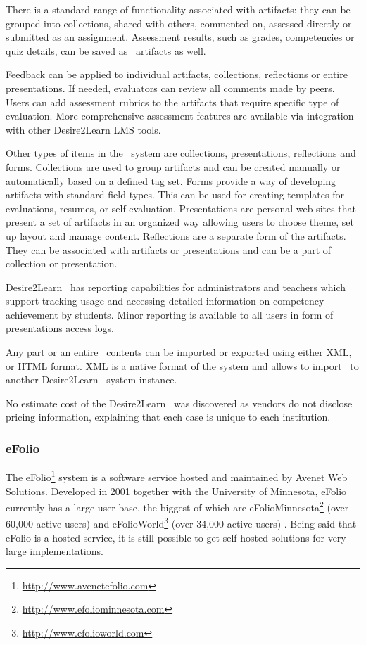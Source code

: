 There is a standard range of functionality associated with artifacts: they can
be grouped into collections, shared with others, commented on, assessed directly
or submitted as an assignment. Assessment results, such as grades, competencies
or quiz details, can be saved as \ep~artifacts as well.

Feedback can be applied to individual artifacts, collections, reflections or
entire presentations. If needed, evaluators can review all comments made by
peers. Users can add assessment rubrics to the artifacts that require specific
type of evaluation. More comprehensive assessment features are available via
integration with other Desire2Learn LMS tools.

Other types of items in the \ep~system are collections, presentations,
reflections and forms. Collections are used to group artifacts and can be
created manually or automatically based on a defined tag set. Forms provide a
way of developing artifacts with standard field types. This can be used for
creating templates for evaluations, resumes, or self-evaluation. Presentations
are personal web sites that present a set of artifacts in an organized way
allowing users to choose theme, set up layout and manage content. Reflections
are a separate form of the artifacts. They can be associated with artifacts or
presentations and can be a part of collection or presentation.

Desire2Learn \ep~has reporting capabilities for administrators and teachers which
support tracking usage and accessing detailed information on competency
achievement by students. Minor reporting is available to all users in form of
presentations access logs.

Any part or an entire \ep~contents can be imported or exported using
either XML, or HTML format. XML is a native format of the system and allows to
import \ep~to another Desire2Learn \ep~system instance.

No estimate cost of the Desire2Learn \ep~was discovered as vendors do not
disclose pricing information, explaining that each case is unique to each
institution.
 
\subsubsection{eFolio}

The eFolio\footnote{\url{http://www.avenetefolio.com}} system is a software
service hosted and maintained by Avenet Web Solutions. Developed in 2001
together with the University of Minnesota, eFolio currently has a large user
base, the biggest of which are
eFolioMinnesota\footnote{\url{http://www.efoliominnesota.com}} (over 60,000
active users) and eFolioWorld\footnote{\url{http://www.efolioworld.com}} (over
34,000 active users) \citep{AAEEBL2011}. Being said that eFolio is a hosted
service, it is still possible to get self-hosted solutions for very large
implementations.

